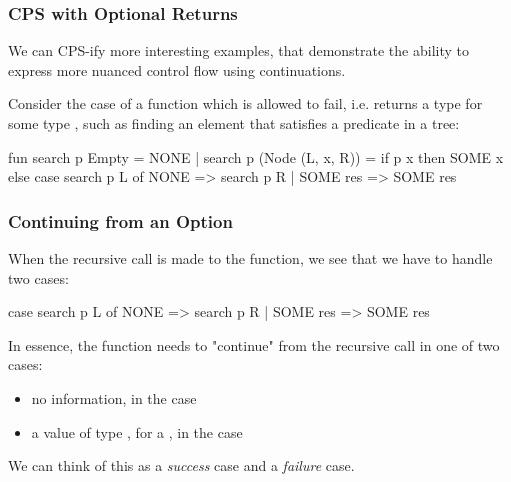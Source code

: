 \documentclass[aspectratio=169, handout]{beamer}
\begin{document}

\begin{frame}[fragile]
  \frametitle{CPS with Optional Returns}

  We can CPS-ify more interesting examples, that demonstrate the
  ability to express more nuanced control flow using continuations.

  \pause
  \vspace{\fill}

  Consider the case of a function which is allowed to fail, i.e.
  returns a type  for some type , such as
  finding an element that satisfies a predicate in a tree:

  \begin{codeblock}
    fun search p Empty = NONE
      | search p (Node (L, x, R)) =
          if p x then
            SOME x 
          else
            case search p L of
              NONE => search p R
            | SOME res => SOME res
  \end{codeblock}
\end{frame}

\begin{frame}[fragile]
  \frametitle{Continuing from an Option}

  When the recursive call is made to the function, we see that we have to handle
  two cases:
  \begin{codeblock}
    case search p L of
      NONE => search p R
    | SOME res => SOME res
  \end{codeblock}

  \pause
  \vspace{\fill}

  In essence, the function needs to "continue" from the recursive call in
  one of two cases: 
  \begin{itemize}
    \item no information, in the  case \pause
    \item a value of type , for a , in the  case
  \end{itemize}

  \pause
  \vspace{\fill}

  We can think of this as a \textit{success} case and a \textit{failure} case.
\end{frame}
\end{document}
